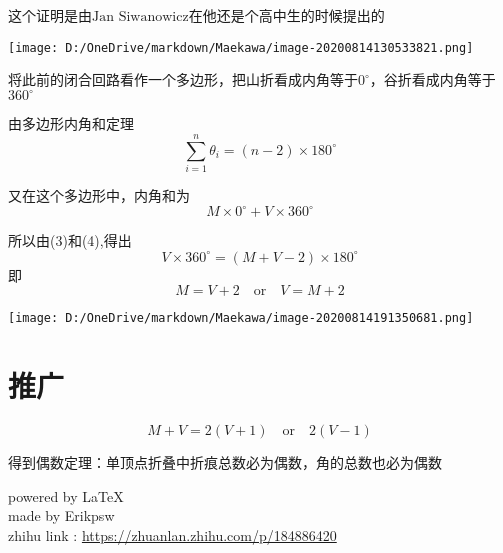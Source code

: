 \documentclass[a4paper,12pt]{article}
\begin{document}
这个证明是由$\text{Jan Siwanowicz}$在他还是个高中生的时候提出的
\begin{center}
\texttt{[image: D:/OneDrive/markdown/Maekawa/image-20200814130533821.png]}\\
\end{center}

将此前的闭合回路看作一个多边形，把山折看成内角等于$0^{\circ}$，谷折看成内角等于$360^{\circ}$

由多边形内角和定理
\begin{equation}\label{6}
    \sum\limits_{i=1}^n\theta_i=(n-2)×180^{\circ}
    \end{equation}


又在这个多边形中，内角和为
\begin{equation}\label{7}
    M \times 0^{\circ} +V \times 360^{\circ}
    \end{equation}


所以由(3)和(4),得出
\begin{equation}\label{8}
    V\times 360^{\circ} = (M +V-2)\times 180^{\circ}
    \end{equation}
即
\begin{equation}\label{9}
    M = V +2 \quad \text{or}\quad V = M + 2
    \end{equation}
\begin{center}
\texttt{[image: D:/OneDrive/markdown/Maekawa/image-20200814191350681.png]}\\
\end{center}

\section{推广}
\begin{equation}\label{3}
    M + V = 2(V+1) \quad \text{or} \quad2(V- 1)
    \end{equation}

得到偶数定理：单顶点折叠中折痕总数必为偶数，角的总数也必为偶数
\begin{flushright}
    powered by \LaTeX\\
    made by Erikpsw\\ 
    zhihu link : \url{https://zhuanlan.zhihu.com/p/184886420}
\end{flushright}



\end{document}
